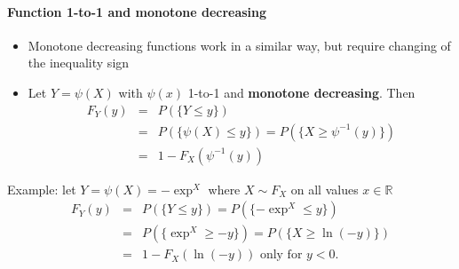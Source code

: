 \documentclass[notes=show,smaller,handout]{beamer}\usepackage[]{graphicx}\usepackage[]{color}
\renewcommand{\Pr}{P}
\newenvironment{stepitemize}{\begin{itemize}[<+->]}{\end{itemize} }
\begin{document}
\begin{frame}{\secname}
  \framesubtitle{Function 1-to-1 and monotone decreasing}

  \begin{stepitemize}
  \item Monotone decreasing functions work in a similar way, but require
  changing of the inequality sign

  \item Let $Y=\psi \left( X\right) $ with $\psi \left( x\right) $ 1-to-1 and
  \textbf{monotone decreasing}. Then
  \begin{eqnarray*}
  F_{Y}\left( y\right) &=&\Pr \left( \{ Y\leq y \} \right) \\
  &=&\Pr \left( \{ \psi \left( X\right) \leq y \} \right) =\Pr \left( \{ X\geq \psi
  ^{-1}\left( y\right) \} \right) \\
  &=&1-F_{X}\left( \psi ^{-1}\left( y\right) \right)
  \end{eqnarray*}

  \end{stepitemize}
  \begin{example}
  Example: let $Y=\psi \left( X\right) =-\exp^ X $ where $%
  X\sim F_X$ on all values $x\in
  \mathbb{R}
  $%
  \begin{eqnarray*}
  F_{Y}\left( y\right) &=&\Pr \left( \{ Y\leq y \}\right) =\Pr \left( \{ -\exp ^
  X \leq y \} \right) \\
  &=&\Pr \left( \{ \exp^ X \geq -y \} \right) =\Pr \left( \{ X\geq \ln
  \left( -y\right) \} \right) \\
  &=&1-F_{X}\left( \ln \left( -y\right) \right) \text{ only for }y<0\text{.}
  \end{eqnarray*}
  \end{example}
\end{frame}
\end{document}
